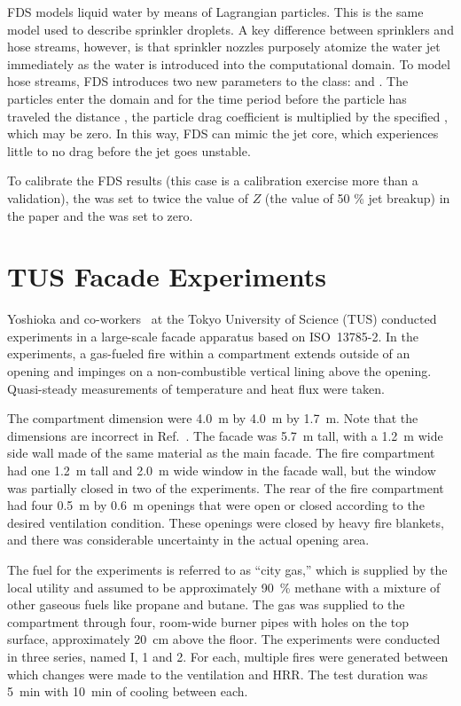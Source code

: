 FDS models liquid water by means of Lagrangian particles.  This is the same model used to describe sprinkler droplets.  A key difference between sprinklers and hose streams, however, is that sprinkler nozzles purposely atomize the water jet immediately as the water is introduced into the computational domain.  To model hose streams, FDS introduces two new parameters to the  class:  and .  The particles enter the domain and for the time period before the particle has traveled the distance , the particle drag coefficient is multiplied by the specified , which may be zero.  In this way, FDS can mimic the jet core, which experiences little to no drag before the jet goes unstable.

To calibrate the FDS results (this case is a calibration exercise more than a validation), the   was set to twice the value of $Z$ (the value of 50 \% jet breakup) in the paper and the  was set to zero.


\section{TUS Facade Experiments}
\label{TUS_Facade_Description}

Yoshioka and co-workers~\cite{Yoshioka:FST2012} at the Tokyo University of Science (TUS) conducted experiments in a large-scale facade apparatus based on ISO~13785-2. In the experiments, a gas-fueled fire within a compartment extends outside of an opening and impinges on a non-combustible vertical lining above the opening. Quasi-steady measurements of temperature and heat flux were taken.

The compartment dimension were 4.0~m by 4.0~m by 1.7~m. Note that the dimensions are incorrect in Ref.~\cite{Yoshioka:FST2012}. The facade was 5.7~m tall, with a 1.2~m wide side wall made of the same material as the main facade. The fire compartment had one 1.2~m tall and 2.0~m wide window in the facade wall, but the window was partially closed in two of the experiments. The rear of the fire compartment had four 0.5~m by 0.6~m openings that were open or closed according to the desired ventilation condition. These openings were closed by heavy fire blankets, and there was considerable uncertainty in the actual opening area.

The fuel for the experiments is referred to as ``city gas,'' which is supplied by the local utility and assumed to be approximately 90~\% methane with a mixture of other gaseous fuels like propane and butane. The gas was supplied to the compartment through four, room-wide burner pipes with holes on the top surface, approximately 20~cm above the floor. The experiments were conducted in three series, named I, 1 and 2. For each, multiple fires were generated between which changes were made to the ventilation and HRR. The test duration was 5~min with 10~min of cooling between each.

